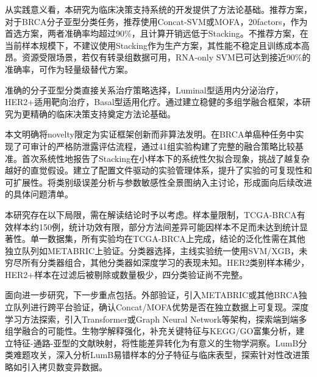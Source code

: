 从实践意义看，本研究为临床决策支持系统的开发提供了方法论基础。推荐方案，对于BRCA分子亚型分类任务，推荐使用Concat-SVM或MOFA，20factors，作为首选方案，两者准确率均超过90\%，且计算开销远低于Stacking。不推荐方案，在当前样本规模下，不建议使用Stacking作为生产方案，其性能不稳定且训练成本高昂。资源受限场景，若仅有转录组数据可用，RNA-only SVM已可达到接近90\%的准确率，可作为轻量级替代方案。

准确的分子亚型分类直接关系治疗策略选择，Luminal型适用内分泌治疗，HER2+适用靶向治疗，Basal型适用化疗。通过建立稳健的多组学融合框架，本研究为更精确的临床决策支持奠定方法论基础。

本文明确将novelty限定为实证框架创新而非算法发明。在BRCA单癌种任务中实现了可审计的严格防泄露评估流程，通过41组实验构建了完整的融合策略比较基准。首次系统性地报告了Stacking在小样本下的系统性欠拟合现象，挑战了越复杂越好的直觉假设。建立了配置文件驱动的实验管理体系，提升了实验的可复现性和可扩展性。将类别级误差分析与参数敏感性全景图纳入主讨论，形成面向后续改进的具体问题清单。

本研究存在以下局限，需在解读结论时予以考虑。样本量限制，TCGA-BRCA有效样本约150例，统计功效有限，部分方法间差异可能因样本不足而未达到统计显著性。单一数据集，所有实验均在TCGA-BRCA上完成，结论的泛化性需在其他独立队列如METABRIC上验证。分类器选择，主线实验统一使用SVM/XGB，未穷尽所有分类器组合，其他分类器如深度学习的表现未知。HER2类别样本稀少，HER2+样本在过滤后被剔除或数量极少，四分类验证尚不完整。

面向进一步研究，下一步重点包括。外部验证，引入METABRIC或其他BRCA独立队列进行跨平台验证，确认Concat/MOFA优势是否在独立数据上可复现。深度学习方法探索，引入Transformer或Graph Neural Network等架构，探索端到端多组学融合的可能性。生物学解释强化，补充关键特征与KEGG/GO富集分析，建立特征-通路-亚型的文献映射，将性能差异转化为有意义的生物学洞察。LumB分类难题攻关，深入分析LumB易错样本的分子特征与临床表型，探索针对性改进策略如引入拷贝数变异数据。


